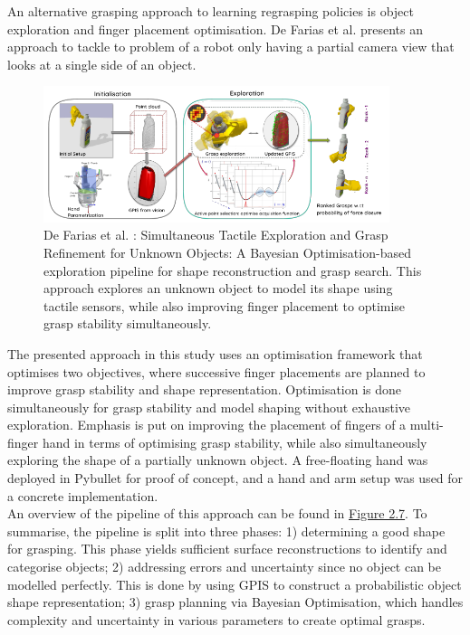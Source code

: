 \documentclass[11pt, a4paper]{report}
\begin{document}
An alternative grasping approach to learning regrasping policies is object exploration and finger placement optimisation. De Farias et al. \cite{de_Farias_2021} presents an approach to tackle to problem of a robot only having a partial camera view that looks at a single side of an object.
\begin{figure}[H]
    \centering
    \includegraphics[width=0.9\textwidth]{docs/Project Report/Media/2_3_de_farias_network.png}
    \caption{De Farias et al. \cite{de_Farias_2021}: Simultaneous Tactile Exploration and Grasp Refinement for Unknown Objects: A Bayesian Optimisation-based exploration pipeline for shape reconstruction and grasp search. This approach explores an unknown object to model its shape using tactile sensors, while also improving finger placement to optimise grasp stability simultaneously.}
    \label{fig:2.7}
\end{figure}
The presented approach in this study uses an optimisation framework that optimises two objectives, where successive finger placements are planned to improve grasp stability and shape representation. Optimisation is done simultaneously for grasp stability and model shaping without exhaustive exploration. Emphasis is put on improving the placement of fingers of a multi-finger hand in terms of optimising grasp stability, while also simultaneously exploring the shape of a partially unknown object. A free-floating hand was deployed in Pybullet for proof of concept, and a hand and arm setup was used for a concrete implementation.\\

An overview of the pipeline of this approach can be found in \hyperref[fig:2.7]{Figure 2.7}. To summarise, the pipeline is split into three phases: 1) determining a good shape for grasping. This phase yields sufficient surface reconstructions to identify and categorise objects; 2) addressing errors and uncertainty since no object can be modelled perfectly. This is done by using GPIS to construct a probabilistic object shape representation; 3) grasp planning via Bayesian Optimisation, which handles complexity and uncertainty in various parameters to create optimal grasps.
\end{document}
